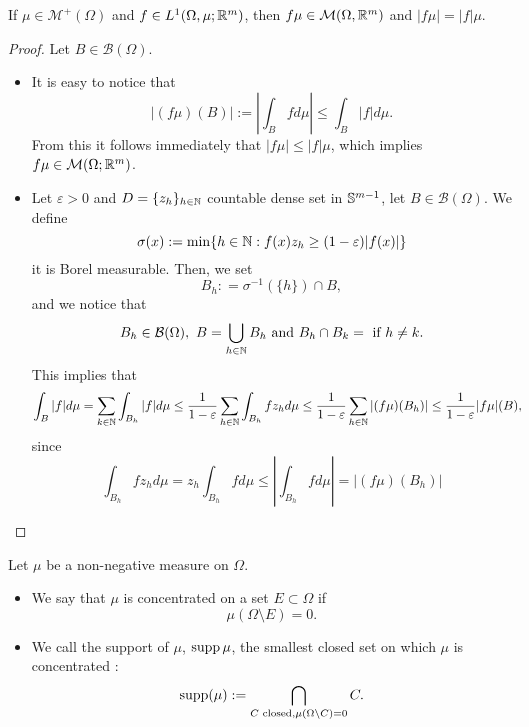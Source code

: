 \begin{lemma}
If $\mu \in \mathcal{M}^+(\Omega)$ and $f\in L^1(\Omega,\mu;\R^m)$, then $f\mu \in \mathcal{M}(\Omega,\R^m)$ and $|f\mu| = |f|\mu$.
\end{lemma}
\begin{proof}
Let $B \in \mathcal{B}(\Omega)$.
\begin{itemize}
\item It is easy to notice that
\begin{equation*}
|(f \mu)(B)| := | \int_B f d\mu| \leq \int_B |f| d\mu.
\end{equation*} 
From this it follows immediately that $|f\mu| \leq |f| \mu$, which implies $f\mu \in \mathcal{M}(\Omega;\R^m)$. 
\item Let $\varepsilon > 0$ and $D = \{z_h\}_{h\in\N}$ countable dense set in
$\S^{m-1}$, let $B \in \mathcal{B}(\Omega)$. We define 
\[
\sigma(x) := \min \{h\in \N: f(x) z_h \geq (1-\varepsilon)|f(x)|\}
\]
it is Borel measurable. Then, we set $$B_h : = \sigma^{-1}(\{h\}) \cap B,$$ 
and we notice that 
\begin{equation*}
B_{h} \in \mathcal{B}(\Omega), \ B = \bigcup_{h\in\N} B_h \text{ and } B_h \cap B_k = \empty \text{ if } h\neq k. 
\end{equation*}
This implies that 
\[
\begin{aligned}
\int_B |f| d\mu 
&= \sum_{k\in\N} \int_{B_h} |f| d\mu 
\leq \frac{1}{1-\varepsilon} \sum_{h\in\N} \int_{B_h} f z_h d\mu 
\leq \frac{1}{1-\varepsilon} \sum_{h\in\N} |(f \mu)(B_h)|  
\leq \frac{1}{1-\varepsilon}  |f \mu|(B),
\end{aligned}
\]
since 
\[
\int_{B_h} f z_h d\mu 
= z_h \int_{B_h} f d\mu 
\leq \left|\int_{B_h} f d\mu \right|
= |(f \mu)(B_h)|  
\]
\end{itemize}
\end{proof}

\begin{definition}
Let $\mu$ be a non-negative measure on $\Omega$.
\begin{itemize}
\item We say that $\mu$ is concentrated on a set $E \subset \Omega$ if  
\[
\mu(\Omega \setminus E) = 0.
\]
\item We call the support of $\mu$, $\supp \mu$, the smallest closed set on
which $\mu$ is concentrated :
\[
\supp (\mu) := \bigcap_{C \text{ closed}, \mu (\Omega\setminus C) = 0} C.
\]
\end{itemize}
\end{definition}

